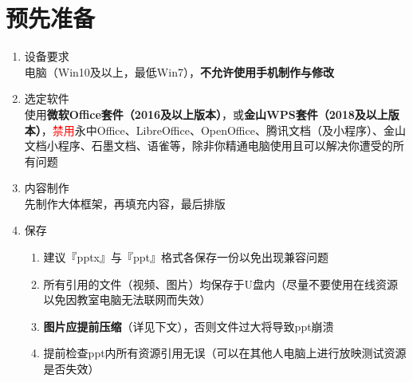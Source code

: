 \section[预先准备]{预先准备}
\begin{enumerate}
    \item 设备要求\\
          电脑（Win10及以上，最低Win7），\textbf{不允许使用手机制作与修改}
    \item 选定软件\\
          使用\textbf{微软Office套件（2016及以上版本）}，或\textbf{金山WPS套件（2018及以上版本）}，\textcolor{red}{禁用}永中Office、LibreOffice、OpenOffice、腾讯文档（及小程序）、金山文档小程序、石墨文档、语雀等，除非你精通电脑使用且可以解决你遭受的所有问题
    \item 内容制作\\
          先制作大体框架，再填充内容，最后排版
    \item 保存
          \begin{enumerate}
              \item 建议『pptx』与『ppt』格式各保存一份以免出现兼容问题
              \item 所有引用的文件（视频、图片）均保存于U盘内（尽量不要使用在线资源以免因教室电脑无法联网而失效）
              \item \textbf{图片应提前压缩}（详见下文），否则文件过大将导致ppt崩溃
              \item 提前检查ppt内所有资源引用无误（可以在其他人电脑上进行放映测试资源是否失效）
          \end{enumerate}
\end{enumerate}

